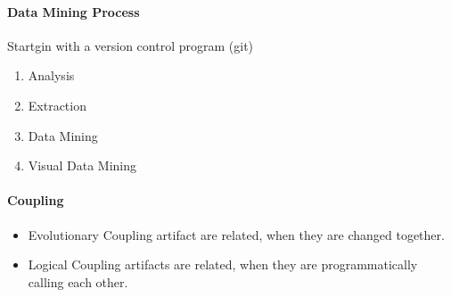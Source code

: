 \documentclass[10pt,a4paper]{article}
\begin{document}
	\paragraph{Data Mining Process}
	Startgin with a version control program (git)
	\begin{enumerate}
		\item Analysis
		\item Extraction
		\item Data Mining
		\item Visual Data Mining
	\end{enumerate} 
	
	
	\paragraph{Coupling}
	\begin{itemize}
		\item Evolutionary Coupling artifact are related, when they are changed together.
		\item Logical Coupling artifacts are related, when they are programmatically calling each other.
	\end{itemize}
		
\end{document}
